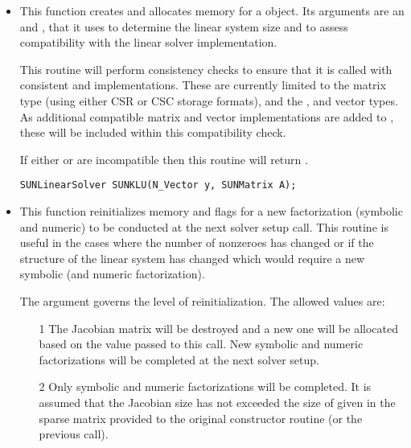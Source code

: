 \begin{itemize}


\item {}

  This function creates and allocates memory for a {\sunlinsolklu}
  object.  Its arguments are an {\nvector} and {\sunmatrix}, that it
  uses to determine the linear system size and to assess compatibility
  with the linear solver implementation. 

  This routine will perform consistency checks to ensure that it is
  called with consistent {\nvector} and {\sunmatrix} implementations.
  These are currently limited to the {\sunmatsparse} matrix type
  (using either CSR or CSC storage formats), and the {\nvecs},
  {\nvecopenmp} and {\nvecpthreads} vector types.  As additional
  compatible matrix and vector implementations are added to
  {\sundials}, these will be included within this compatibility
  check. 

  If either  or  are incompatible then this routine will
  return .

  \verb|SUNLinearSolver SUNKLU(N_Vector y, SUNMatrix A);|


\item {}

  This function reinitializes memory and flags for a new factorization
  (symbolic and numeric) to be conducted at the next solver setup
  call.  This routine is useful in the cases where the number of
  nonzeroes has changed or if the structure of the linear system has
  changed which would require a new symbolic (and numeric
  factorization). 

  The  argument governs the level of
  reinitialization.  The allowed values are: 
  \begin{itemize}
  \item[1] The Jacobian matrix will be destroyed and a new one will be
    allocated based on the  value passed to this call.  New
    symbolic and numeric factorizations will be completed at the next
    solver setup.
  \item[2] Only symbolic and numeric factorizations will be completed.
    It is assumed that the Jacobian size has not exceeded the size of
     given in the sparse matrix provided to the original
    constructor routine (or the previous  call). 
  \end{itemize}
  

\end{itemize}
